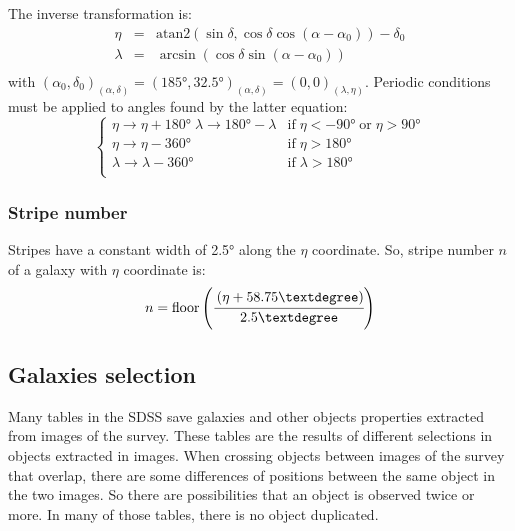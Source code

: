 The inverse transformation is:
%
\begin{eqnarray}
    \eta &=&
        \mathrm{atan2}
        \left(\sin\delta,\cos\delta\cos\left(\alpha-\alpha_0\right)\right)-
            \delta_0\nonumber\\
    \lambda &=&
        \arcsin\left(\cos\delta\sin\left(\alpha-\alpha_0\right)\right)
            \nonumber\\
\end{eqnarray}
%
with ${\left(\alpha_0,\delta_0\right)}_{\left(\alpha,\delta\right)}=
{\left(185°,32.5°\right)}_{\left(\alpha,\delta\right)}=
{\left(0,0\right)}_{\left(\lambda,\eta\right)}$. Periodic conditions must be
applied to angles found by the latter equation:
%
\begin{equation}
    \begin{cases}
        \eta\rightarrow\eta+180° \; \lambda\rightarrow180°-\lambda&
        \mbox{if}\;\eta<-90°\;\mbox{or}\; \eta>90°\\
        \eta\rightarrow\eta-360° &
        \mbox{if}\;\eta>180°\\
        \lambda\rightarrow\lambda-360° &
        \mbox{if}\;\lambda>180°\\
    \end{cases}
\end{equation}
%
\subsubsection{Stripe number}
%
Stripes have a constant width of 2.5° along the $\eta$ coordinate. So,
stripe number $n$ of a galaxy with $\eta$ coordinate is:
%
\begin{equation}
    n = \mathrm{floor}\left(\cfrac{\left(\eta+58.75°\right)}{2.5°}\right)
\end{equation}
%
\subsection{Galaxies selection}
%
Many tables in the SDSS save galaxies and other objects properties extracted
from images of the survey. These tables are the results of different
selections in objects extracted in images. When crossing objects between
images of the survey that overlap, there are some differences of positions
between the same object in the two images. So there are possibilities that
an object is observed twice or more. In many of those tables, there is no
object duplicated.

